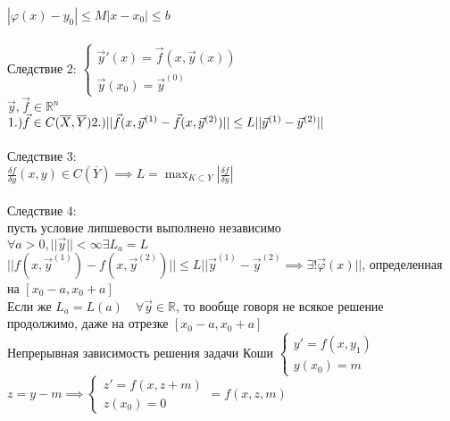 \documentclass[12pt, a4paper]{article}
\begin{document}
$|\varphi(x) - y_0| \le M|x-x_0| \le b$\\\\

Следствие 2:
$\left\{
\begin{matrix}
\vec{y}'(x) = \vec{f}(x, \vec{y}(x))\\
\vec{y}(x_0) = \vec{y}^{(0)}

\end{matrix} \right.$ \\

$\vec{y}, \vec{f} \in \mathbb{R}^n$ \\

$1.) \vec{f} \in C(\overline{X}, \overline{Y})\\
 2.) || \vec{f}(x, \vec{y}^{(1)} - \vec{f}(x, \vec{y}^{(2)}) || \le L|| \vec{y}^{(1)} - \vec{y}^{(2)} ||$\\\\

Следствие 3:\\
$\frac{\delta f}{\delta y}(x, y) \in C(\overline{Y}) \implies L = \max_{K \subset Y} |\frac{\delta f}{\delta y}|$\\\\

Следствие 4:\\

пусть условие липшевости выполнено независимо\\

$\forall a >0, ||\vec{y}|| < \infty \exists L_a = L$\\

$||f(x, \vec{y}^{(1)}) - f(x, \vec{y}^{(2)})|| \le L || \vec{y}^{(1)} - \vec{y}^{(2)} \implies \exists! \vec{\varphi}(x)||$, определенная на $[x_0 -a, x_0 + a]$\\

Если же $L_a = L(a) \quad \forall \vec{y} \in \mathbb{R}$, то вообще говоря не всякое решение продолжимо, даже на отрезке $[x_0-a, x_0+a]$ \\


Непрерывная зависимость решения задачи Коши
$
\left\{
\begin{matrix}
y' = f(x, y_1) \\
y(x_0) = m
 
\end{matrix}
\right.
$\\
$ z = y - m \implies \left\{
\begin{matrix}
z' = f(x, z+m) \\ z(x_0) = 0
\end{matrix} \right.
 = f(x,z,m)
$ 
\end{document}
